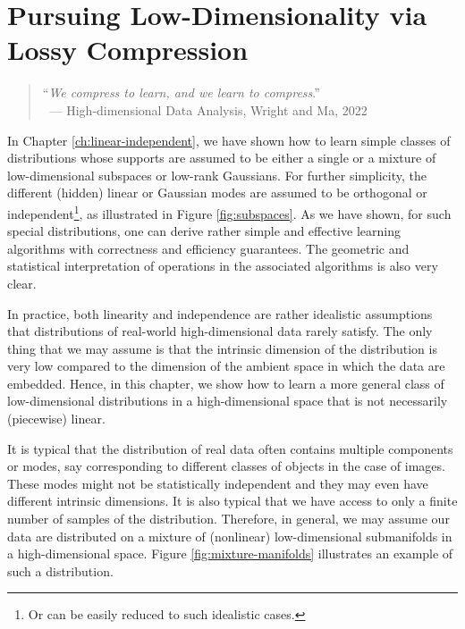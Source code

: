 \documentclass[../../book-main.tex]{subfiles}
\begin{document}
\chapter{Pursuing Low-Dimensionality via Lossy Compression}
\label{ch:compression}\label{ch:general-distribution}

\begin{quote}
	\hfill    ``{\em We compress to learn, and we learn to compress}.''\\
	$~$ \hfill --- High-dimensional Data Analysis, Wright and Ma, 2022
\end{quote}
\vspace{5mm}

In Chapter \ref{ch:linear-independent}, we have shown how to learn simple classes of distributions whose supports are assumed to be either a single or a mixture of low-dimensional subspaces or low-rank Gaussians. For further simplicity, the different (hidden) linear or Gaussian modes are assumed to be orthogonal or independent\footnote{Or can be easily reduced to such idealistic cases.}, as illustrated in Figure \ref{fig:subspaces}. As we have shown, for such special distributions, one can derive rather simple and effective learning algorithms with correctness and efficiency guarantees. The geometric and statistical interpretation of operations in the associated algorithms is also very clear.

In practice, both linearity and independence are rather idealistic assumptions that distributions of real-world high-dimensional data rarely satisfy. The only thing that we may assume is that the intrinsic dimension of the distribution is very low compared to the dimension of the ambient space in which the data are embedded. Hence, in this chapter, we show how to learn a more general class of low-dimensional distributions in a high-dimensional space that is not necessarily (piecewise) linear.

It is typical that the distribution of real data often contains multiple components or modes, say corresponding to different classes of objects in the case of images. These modes might not be statistically independent and they may even have different intrinsic dimensions. It is also typical that we have access to only a finite number of samples of the distribution. Therefore, in  general, we may assume our data are distributed on a mixture of (nonlinear) low-dimensional submanifolds in a high-dimensional space. Figure \ref{fig:mixture-manifolds} illustrates an example of such a distribution.
\end{document}
